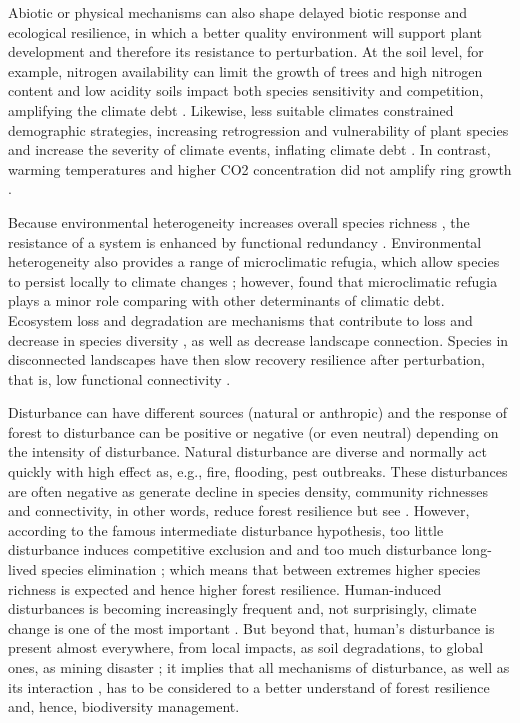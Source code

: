Abiotic or physical mechanisms can also shape delayed biotic response and ecological resilience, in which a better quality environment will support plant development and therefore its resistance to perturbation.
At the soil level, for example, nitrogen availability can limit the growth of trees \parencite{Sullivan2013} and high nitrogen content and low acidity soils impact both species sensitivity and competition, amplifying the climate debt \parencite{Bertrand2016}.
Likewise, less suitable climates constrained demographic strategies, increasing retrogression and vulnerability of plant species \parencite{Csergo2017} and increase the severity of climate events, inflating climate debt \parencite{Bertrand2016}.
In contrast, warming temperatures and higher CO2 concentration did not amplify ring growth \parencite{Girardin2017}.

Because environmental heterogeneity increases overall species richness \parencite{Stein2014}, the resistance of a system is enhanced by functional redundancy \parencite{Oliver2015}.
Environmental heterogeneity also provides a range of microclimatic refugia, which allow species to persist locally to climate changes \parencite{Maclean2015}; however, \textcite{Bertrand2016} found that microclimatic refugia plays a minor role comparing with other determinants of climatic debt.
Ecosystem loss and degradation are mechanisms that contribute to loss and decrease in species diversity \parencite{Essl2015}, as well as decrease landscape connection.
Species in disconnected landscapes have then slow recovery resilience after perturbation, that is, low functional connectivity \parencite{Oliver2015}.

Disturbance can have different sources (natural or anthropic) and the response of forest to disturbance can be positive or negative (or even neutral) depending on the intensity of disturbance.
Natural disturbance are diverse and normally act quickly with high effect as, e.g., fire, flooding, pest outbreaks.
These disturbances are often negative as generate decline in species density, community richnesses and connectivity, in other words, reduce forest resilience \parencite{Buma2011,Essl2015} but see \parencite{Bertrand2016}.
However, according to the famous intermediate disturbance hypothesis, too little disturbance induces competitive exclusion and and too much disturbance long-lived species elimination \parencite{Grime1973,Horn1975,Connell1978}; which means that between extremes higher species richness is expected and hence higher forest resilience.
Human-induced disturbances is becoming increasingly frequent and, not surprisingly, climate change is one of the most important \parencite{Bellard2012}.
But beyond that, human's disturbance is present almost everywhere, from local impacts, as soil degradations, to global ones, as mining disaster \parencite{Garcia2017}; it implies that all mechanisms of disturbance, as well as its interaction \parencite{Goring2017}, has to be considered to a better understand of forest resilience and, hence, biodiversity management.

